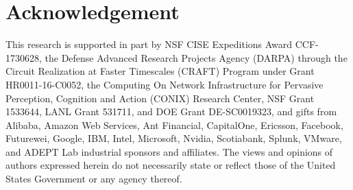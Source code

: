 \section*{Acknowledgement}
This research is supported in part by NSF CISE Expeditions Award CCF-1730628, the Defense Advanced Research Projects Agency (DARPA) through the Circuit Realization at Faster Timescales (CRAFT) Program under Grant HR0011-16-C0052, the Computing On Network Infrastructure for Pervasive Perception, Cognition and Action (CONIX) Research Center, NSF Grant 1533644, LANL Grant 531711, and DOE Grant DE-SC0019323, and gifts from Alibaba, Amazon Web Services, Ant Financial, CapitalOne, Ericsson, Facebook, Futurewei, Google, IBM, Intel, Microsoft, Nvidia, Scotiabank, Splunk, VMware, and ADEPT Lab industrial sponsors and affiliates. The views and opinions of authors expressed herein do not necessarily state or reflect those of the United States Government or any agency thereof.
